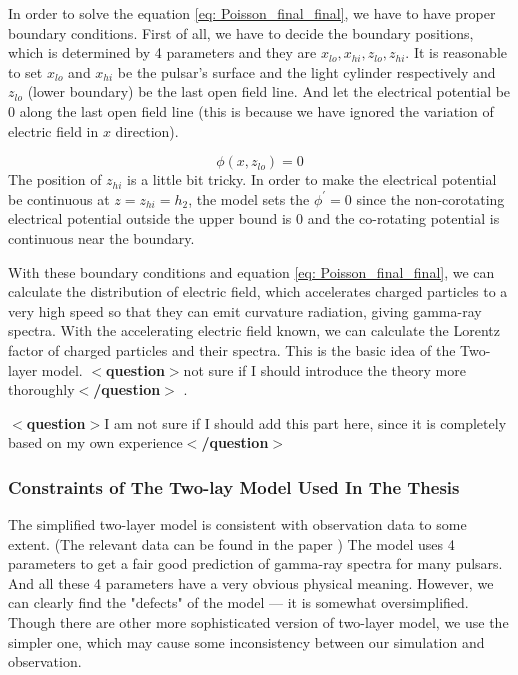 \documentclass[12pt]{report}
\newcommand{\question}[1]{
  $<$\textbf{question}$>$#1$<$\textbf{/question}$>$
}
\begin{document}
          In order to solve the equation \ref{eq: Poisson_final_final}, we have to have proper boundary conditions. 
          First of all, we have to decide the boundary positions, which is determined by 4 parameters and they are  
          $x_{lo}, x_{hi}, z_{lo}, z_{hi}$. It is reasonable to set $x_{lo}$ and $x_{hi}$
          be the pulsar's surface and the light cylinder respectively and $z_{lo}$ (lower boundary) be the last open 
          field line. And let the electrical potential be $0$ along the last open field line (this is because we have 
          ignored the variation of electric field in $x$ direction).   

          \begin{equation}
            \label{eq: lower_boundary}
            \phi \left(x, z_{lo}\right) = 0
          \end{equation}
          The position of $z_{hi}$ is a little bit tricky. In order to make the electrical potential be 
          continuous at $z = z_{hi} = h_2$, the model sets the $\phi^{\prime} = 0$ since the 
          non-corotating electrical potential outside the upper bound is $0$ and the co-rotating potential
          is continuous near the boundary. 

          With these boundary conditions and equation \ref{eq: Poisson_final_final}, we can calculate the 
          distribution of electric field, which accelerates charged particles to a very high speed so that 
          they can emit curvature radiation, giving gamma-ray spectra. With the accelerating electric field 
          known, we can calculate the Lorentz factor of charged particles and their spectra. This is the 
          basic idea of the Two-layer model. \question{not sure if I should introduce the theory more 
          thoroughly}.

          \question{I am not sure if I should add this part here, since it is completely based on 
            my own experience}
          \subsubsection{Constraints of The Two-lay Model Used In The Thesis} 
            The simplified two-layer model is consistent with observation data to some extent. 
            (The relevant data can be found in the paper 
            \href{http://iopscience.iop.org/article/10.1088/0004-637X/720/1/178/pdf}
            {})
            The model uses 4 parameters to get a fair good prediction of gamma-ray spectra for many 
            pulsars. And all these 4 parameters have a very obvious physical meaning. 
            However, we can clearly find the "defects" of the model --- it is somewhat oversimplified. 
            Though there are other more sophisticated version of two-layer model, we use the simpler one, 
            which may cause some inconsistency between our simulation and observation. 
\end{document}

